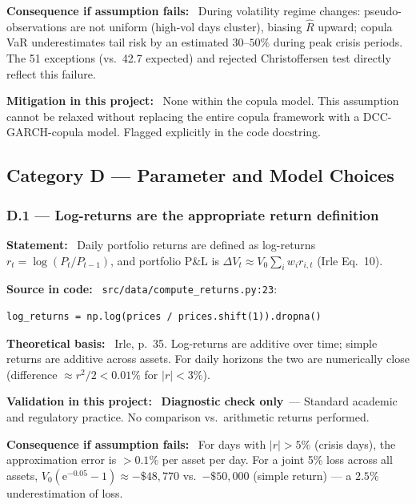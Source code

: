 \documentclass[11pt,a4paper]{article}
\newcommand{\asmfield}[1]{\medskip\noindent\textbf{#1:}\ }
\newcommand{\code}[1]{\texttt{#1}}
\newcommand{\diagnostic}{\textbf{Diagnostic check only}}
\begin{document}
\asmfield{Consequence if assumption fails}
During volatility regime changes: pseudo-observations are not uniform (high-vol
days cluster), biasing $\hat{R}$ upward; copula VaR underestimates tail
risk by an estimated $30$--$50\%$ during peak crisis periods. The 51
exceptions (vs.\ 42.7 expected) and rejected Christoffersen test directly
reflect this failure.

\asmfield{Mitigation in this project}
None within the copula model. This assumption cannot be relaxed without
replacing the entire copula framework with a DCC-GARCH-copula model.
Flagged explicitly in the code docstring.

\subsection{Category D --- Parameter and Model Choices}\label{sec:catD}

\subsubsection{D.1 --- Log-returns are the appropriate return definition}\label{asm:D1}

\asmfield{Statement}
Daily portfolio returns are defined as log-returns $r_t = \log(P_t/P_{t-1})$,
and portfolio P\&L is $\Delta V_t \approx V_0 \sum_i w_i r_{i,t}$ (Irle
Eq.~10).

\asmfield{Source in code}
\code{src/data/compute\_returns.py:23}:
\begin{lstlisting}
log_returns = np.log(prices / prices.shift(1)).dropna()
\end{lstlisting}

\asmfield{Theoretical basis}
Irle, p.~35. Log-returns are additive over time; simple returns are additive
across assets. For daily horizons the two are numerically close (difference
$\approx r^2/2 < 0.01\%$ for $|r| < 3\%$).

\asmfield{Validation in this project}
\diagnostic\ --- Standard academic and regulatory practice. No comparison
vs.\ arithmetic returns performed.

\asmfield{Consequence if assumption fails}
For days with $|r| > 5\%$ (crisis days), the approximation error is $> 0.1\%$
per asset per day. For a joint 5\% loss across all assets,
$V_0 (\mathrm{e}^{-0.05} - 1) \approx -\$48{,}770$ vs.\ $-\$50{,}000$
(simple return) --- a $2.5\%$ underestimation of loss.
\end{document}
